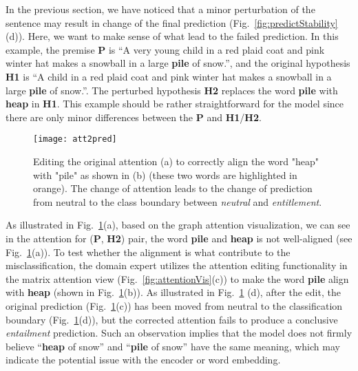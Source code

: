 In the previous section, we have noticed that a minor perturbation of the sentence may result in change of the final prediction (Fig.~\ref{fig:predictStability}(d)). Here, we want to make sense of what lead to the failed prediction. In this example, the premise \textbf{P} is ``A very young child in a red plaid coat and pink winter hat makes a snowball in a large \textbf{pile} of snow.'', and the original hypothesis \textbf{H1} is ``A child in a red plaid coat and pink winter hat makes a snowball in a large \textbf{pile} of snow.''. The perturbed hypothesis \textbf{H2} replaces the word \textbf{pile} with \textbf{heap} in \textbf{H1}. This example should be rather straightforward for the model since there are only minor differences between the \textbf{P} and \textbf{H1}/\textbf{H2}.

\begin{figure}[htbp]
\centering
\vspace{-2mm}
 \texttt{[image: att2pred]}
 \caption{
Editing the original attention (a) to correctly align the word "heap" with "pile" as shown in (b) (these two words are highlighted in orange).
The change of attention leads to the change of prediction from neutral to the class boundary between \emph{neutral} and \emph{entitlement}.
%
}
\label{fig:att2pred}
\end{figure}

As illustrated in Fig.~\ref{fig:att2pred}(a), based on the graph attention visualization, we can see in the attention for (\textbf{P}, \textbf{H2}) pair, the word \textbf{pile} and \textbf{heap} is not well-aligned (see Fig.~\ref{fig:att2pred}(a)).
%
To test whether the alignment is what contribute to the misclassification, the domain expert utilizes the attention editing functionality in the matrix attention view (Fig.~\ref{fig:attentionVis}(c)) to make the word \textbf{pile} align with \textbf{heap} (shown in Fig.~\ref{fig:att2pred}(b)).
%
As illustrated in Fig.~\ref{fig:att2pred} (d), after the edit, the original prediction (Fig.~\ref{fig:att2pred}(c)) has been moved from neutral to the classification boundary (Fig.~\ref{fig:att2pred}(d)), but the corrected attention fails to produce a conclusive \emph{entailment} prediction.
%
Such an observation implies that the model does not firmly believe ``\textbf{heap} of snow'' and ``\textbf{pile} of snow'' have the same meaning, which may indicate the potential issue with the encoder or word embedding.


